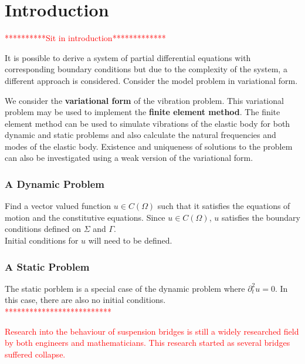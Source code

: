 \documentclass[../../main.tex]{subfiles}
\begin{document}
\setcounter{chapter}{1}
\setcounter{section}{0}
\section{Introduction}

\textcolor{red}{**********Sit in introduction*************}

It is possible to derive a system of partial differential equations with corresponding boundary conditions but due to the complexity of the system, a different approach is considered. Consider the model problem in variational form. 

We consider the {\bf variational form} of the vibration problem. This variational problem may be used to implement the {\bf finite element method}. The finite element method can be used to simulate vibrations of the elastic body for both dynamic and static problems and also calculate the natural frequencies and modes of the elastic body. Existence and uniqueness of solutions to the problem can also be investigated using a weak version of the variational form.

\subsubsection*{A Dynamic Problem}
Find a vector valued function $u \in C(\Omega)$ such that it satisfies the equations of motion and the constitutive equations. Since $u \in C(\Omega)$, $u$ satisfies the boundary conditions defined on $\Sigma$ and $\Gamma$.\\

Initial conditions for $u$ will need to be defined.

\subsubsection*{A Static Problem}
The static porblem is a special case of the dynamic problem  where $\partial_t^2 u = 0$. In this case, there are also no initial conditions.\\
\textcolor{red}{**************************}

\textcolor{red}{Research into the behaviour of suspension bridges is still a widely researched field by both engineers and mathematicians. This research started as several bridges suffered collapse. }
\end{document}
